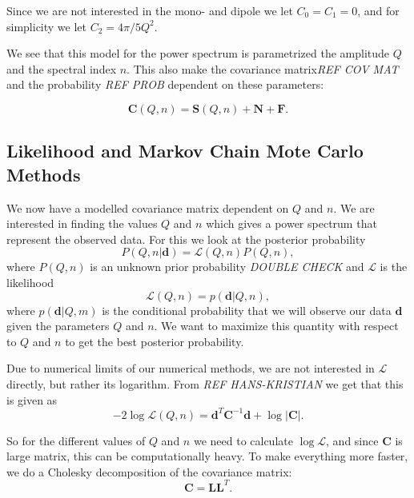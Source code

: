 \documentclass{emulateapj}
\begin{document}
Since we are not interested in the mono- and dipole we let $C_0 = C_1 = 0$, and for simplicity we let $C_2 = 4\pi/5Q^2$.

We see that this model for the power spectrum is parametrized the amplitude $Q$ and the spectral index $n$. This also make the covariance matrix\emph{REF COV MAT} and the probability \emph{REF PROB} dependent on these parameters:

\begin{equation}
\mathbf{C}(Q,n) = \mathbf{S}(Q,n) + \mathbf{N} + \mathbf{F}.
\label{eq:C(Q,n)}
\end{equation}

\subsection{Likelihood and Markov Chain Mote Carlo Methods}
We now have a modelled covariance matrix dependent on $Q$ and $n$. We are interested in finding the values $Q$ and $n$ which gives a power spectrum that represent the observed data. For this we look at the posterior probability
\begin{equation}
P(Q,n|\mathbf{d}) = \mathcal{L}(Q,n)P(Q,n),
\end{equation}
where $P(Q,n)$ is an unknown prior probability \emph{DOUBLE CHECK} and $\mathcal{L}$ is the likelihood
\begin{equation}
\mathcal{L}(Q,n) = p(\mathbf{d}|Q,n),
\end{equation}
where $p(\mathbf{d}|Q,m)$ is the conditional probability that we will observe our data $\mathbf{d}$ given the parameters $Q$ and $n$. We want to maximize this quantity with respect to $Q$ and $n$ to get the best posterior probability.

Due to numerical limits of our numerical methods, we are not interested in $\mathcal{L}$ directly, but rather its logarithm. From \emph{REF HANS-KRISTIAN} we get that this is given as
\begin{equation}
-2\log \mathcal{L}(Q,n) =  \mathbf{d}^T\mathbf{C}^{-1}\mathbf{d} + \log|\mathbf{C}|.
\end{equation}

So for the different values of $Q$ and $n$ we need to calculate $\log \mathcal{L}$, and since $\mathbf{C}$ is large matrix, this can be computationally heavy. To make everything more faster, we do a Cholesky decomposition of the covariance matrix:
\begin{equation}
\mathbf{C} = \mathbf{L}\mathbf{L}^T.
\end{equation} 
 
\end{document}
